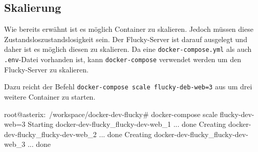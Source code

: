 \subsection{Skalierung}%
\label{sec:docker-compose.skalierung}
Wie bereits erwähnt ist es möglich Container zu skalieren. Jedoch müssen diese Zustandslos\footnotesize{zustandslosigkeit} sein. Der Flucky-Server ist darauf ausgelegt und daher ist es möglich diesen zu skalieren. Da eine \texttt{docker-compose.yml} als auch \texttt{.env}-Datei vorhanden ist, kann \texttt{docker-compose} verwendet werden um den Flucky-Server zu skalieren.

Dazu reicht der Befehl \texttt{docker-compose scale flucky-deb-web=3} aus um drei weitere Container zu starten.

\begin{bashcode}
  root@asterix:~/workspace/docker-dev-flucky# docker-compose scale flucky-dev-web=3
  Starting docker-dev-flucky_flucky-dev-web_1 ... done
  Creating docker-dev-flucky_flucky-dev-web_2 ... done
  Creating docker-dev-flucky_flucky-dev-web_3 ... done
\end{bashcode}
